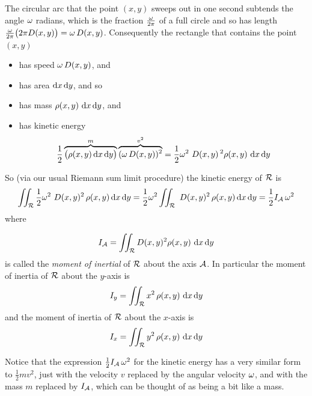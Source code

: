 The circular arc that the point $(x,y)$ sweeps out in one second
subtends the angle $\omega$ radians, which is the fraction $\frac{\omega}{2\pi}$
of a full circle and so has length 
$\frac{\omega}{2\pi}\big(2\pi D(x,y)\big)=\omega\,D(x,y)$. 
Consequently the rectangle that contains the point $(x,y)$
\begin{itemize}\itemsep1pt \parskip0pt 
\item 
has speed $\omega\,D(x,y)$, and
\item 
has area $\mathrm{d}x\,\mathrm{d}y$, and so
\item
has mass $\rho(x,y)\ \dee{x}\,\dee{y}$, and
\item
has kinetic energy 
\begin{equation*}
\frac{1}{2}\overbrace{\big(\rho(x,y)\,\dee{x}\,\dee{y}\big)}^{m}
                \overbrace{(\om\,D(x,y))^2}^{v^2}
 =\frac{1}{2}\om^2\ D(x,y)\,^2\rho(x,y)\ \dee{x}\,\dee{y}
\end{equation*}
\end{itemize}
So (via our usual Riemann sum limit procedure) 
the kinetic energy of $\mathcal{R}$ is
\begin{equation*}
\dblInt_\cR \frac{1}{2}\om^2\ D(x,y)^2\,\rho(x,y)\,\dee{x}\,\dee{y}
=\frac{1}{2}\om^2 \dblInt_\cR \ D(x,y)^2\,\rho(x,y)\,\dee{x}\,\dee{y}
=\frac{1}{2} I_\cA\,\om^2
\end{equation*}
where
\begin{defn}\label{def moment of inertia}
\begin{equation*}
I_\cA=\dblInt_\cR D(x,y)^2\rho(x,y)\ \dee{x}\,\dee{y}
\end{equation*}
is called the \emph{moment of inertial} of $\mathcal{R}$ about the axis $\mathcal{A}$.
In particular the moment of inertia of $\mathcal{R}$ about the $y$-axis is
\begin{equation*}
I_y=\dblInt_\cR x^2\,\rho(x,y)\ \dee{x}\,\dee{y}
\end{equation*}
and the moment of inertia of $\mathcal{R}$ about the $x$-axis is
\begin{equation*}
I_x=\dblInt_\cR y^2\,\rho(x,y)\ \dee{x}\,\dee{y}
\end{equation*}

\end{defn}
\noindent
Notice that the expression $\frac{1}{2} I_{\mathcal{A}}\,\omega^2$ for the kinetic 
energy has  a very similar form 
to $\frac{1}{2} m v^2$, just with the velocity $v$ replaced by the angular
velocity $\omega$, and with the mass $m$ replaced by $I_{\mathcal{A}}$, which can be thought
of as being a bit like a mass.


